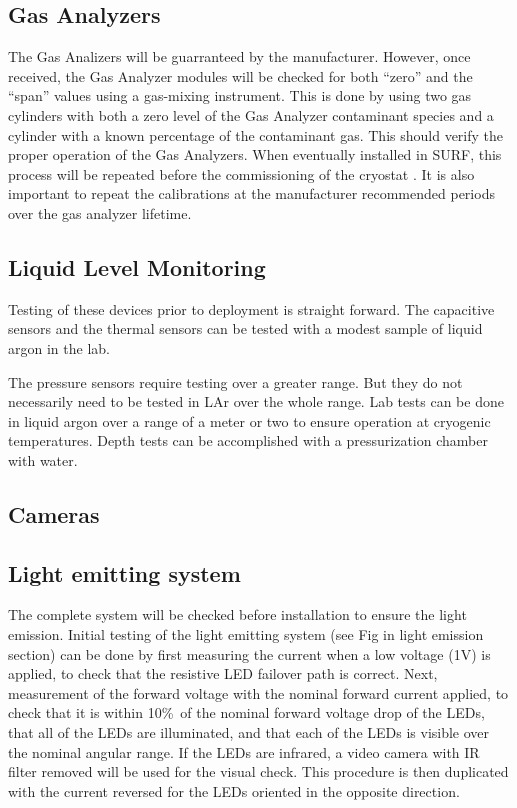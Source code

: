 \subsection{Gas Analyzers}
\label{sec:fdsp-slow-cryo-qc-ga}

The Gas Analizers will be guarranteed by the manufacturer. However, once received, the Gas Analyzer modules will be checked for both ``zero'' and the ``span'' values using a gas-mixing instrument. This is done by using two gas cylinders with both a zero level of the Gas Analyzer contaminant species and a cylinder with a known percentage of the contaminant gas. This should verify the proper operation of the Gas Analyzers. When eventually installed in SURF, this process will be repeated before the commissioning of the cryostat . It is also important to repeat the calibrations at the manufacturer recommended periods over the gas analyzer lifetime.
 

\subsection{Liquid Level Monitoring}
\label{sec:fdsp-slow-cryo-qc-llm}

Testing of these devices prior to deployment is straight forward.  The
capacitive sensors and the thermal sensors can be tested with a modest sample
of liquid argon in the lab.

The pressure sensors require testing over a greater range.  But they do not
necessarily need to be tested in LAr over the whole range.  Lab tests
can be done in liquid argon over a range of a meter or two to ensure operation
at cryogenic temperatures.  Depth tests can be accomplished with a
pressurization chamber with water.


\subsection{Cameras}
\label{sec:fdsp-slow-cryo-qc-c}

\subsection{Light emitting system}
\label{sec:fdsp-slow-cryo-qc-les}

The complete system will be checked before installation to ensure the light emission. 
Initial testing of the light emitting system (see Fig in light
emission section) can be done by first
measuring the current when a low voltage (1V) is applied, to check
that the resistive LED failover path is correct. Next, measurement
of the forward voltage with the nominal forward current applied, to
check that it is within 10\%\ of the nominal forward voltage drop of
the LEDs, that all of the LEDs are illuminated, and that each of the
LEDs is visible over the nominal angular range. If the LEDs are
infrared, a video camera with IR filter removed will be used for the
visual check. This procedure is then duplicated with the current
reversed for the LEDs oriented in the opposite direction.  

